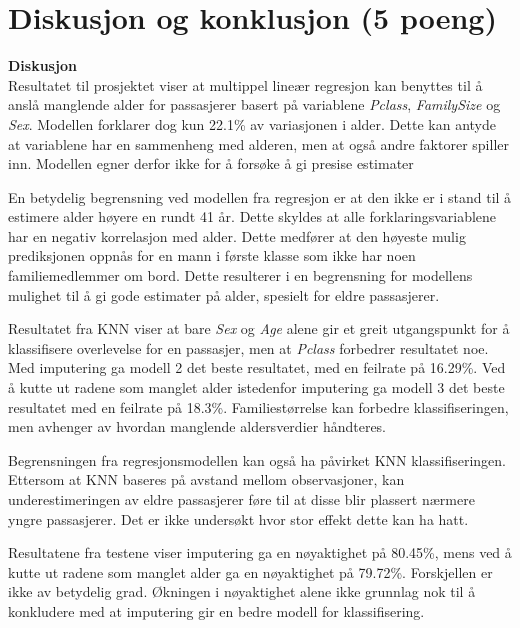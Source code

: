 \section{Diskusjon og konklusjon (5 poeng)}\label{diskusjon-og-konklusjon-5-poeng}

\textbf{Diskusjon} \\
Resultatet til prosjektet viser at multippel lineær regresjon kan benyttes til å anslå manglende alder for passasjerer basert på variablene \textit{Pclass}, \textit{FamilySize} og \textit{Sex}. Modellen forklarer dog kun 22.1\% av variasjonen i alder. Dette kan antyde at variablene har en sammenheng med alderen, men at også andre faktorer spiller inn. Modellen egner derfor ikke for å forsøke å gi presise estimater%

En betydelig begrensning ved modellen fra regresjon er at den ikke er i stand til å estimere alder høyere en rundt 41 år. Dette skyldes at alle forklaringsvariablene har en negativ korrelasjon med alder. Dette medfører at den høyeste mulig prediksjonen oppnås for en mann i første klasse som ikke har noen familiemedlemmer om bord. Dette resulterer i en begrensning for modellens mulighet til å gi gode estimater på alder, spesielt for eldre passasjerer.

Resultatet fra KNN viser at bare \textit{Sex} og \textit{Age} alene gir et greit utgangspunkt for å klassifisere overlevelse for en passasjer, men at \textit{Pclass} forbedrer resultatet noe. Med imputering ga modell 2 det beste resultatet, med en feilrate på 16.29\%. Ved å kutte ut radene som manglet alder istedenfor imputering ga modell 3 det beste resultatet med en feilrate på 18.3\%. Familiestørrelse kan forbedre klassifiseringen, men avhenger av hvordan manglende aldersverdier håndteres.

Begrensningen fra regresjonsmodellen kan også ha påvirket KNN klassifiseringen. Ettersom at KNN baseres på avstand mellom observasjoner, kan underestimeringen av eldre passasjerer føre til at disse blir plassert nærmere yngre passasjerer. Det er ikke undersøkt hvor stor effekt dette kan ha hatt.

Resultatene fra testene viser imputering ga en nøyaktighet på 80.45\%, mens ved å kutte ut radene som manglet alder ga en nøyaktighet på 79.72\%. Forskjellen er ikke av betydelig grad. Økningen i nøyaktighet alene ikke grunnlag nok til å konkludere med at imputering gir en bedre modell for klassifisering. 

